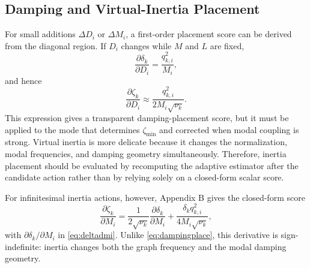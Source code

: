 \documentclass[journal]{IEEEtran}
\begin{document}
\subsection{Damping and Virtual-Inertia Placement}

For small additions $\Delta D_i$ or $\Delta M_i$, a first-order placement score can be derived from the diagonal region. If $D_i$ changes while $M$ and $L$ are fixed,
\begin{equation}
\frac{\partial \delta_k}{\partial D_i}=\frac{q_{k,i}^2}{M_i},
\end{equation}
and hence
\begin{equation}
\frac{\partial \zeta_k}{\partial D_i}\approx
\frac{q_{k,i}^2}{2M_i\sqrt{\nu_k}}.
\label{eq:dampingplace}
\end{equation}
This expression gives a transparent damping-placement score, but it must be applied to the mode that determines $\zeta_{\min}$ and corrected when modal coupling is strong. Virtual inertia is more delicate because it changes the normalization, modal frequencies, and damping geometry simultaneously. Therefore, inertia placement should be evaluated by recomputing the adaptive estimator after the candidate action rather than by relying solely on a closed-form scalar score.

For infinitesimal inertia actions, however, Appendix B gives the closed-form score
\begin{equation}
\frac{\partial\zeta_k}{\partial M_i}
=\frac{1}{2\sqrt{\nu_k}}\frac{\partial\delta_k}{\partial M_i}
+\frac{\delta_k q_{k,i}^2}{4M_i\sqrt{\nu_k}},
\label{eq:inertiascore}
\end{equation}
with $\partial\delta_k/\partial M_i$ in \eqref{eq:deltadmi}. Unlike \eqref{eq:dampingplace}, this derivative is sign-indefinite: inertia changes both the graph frequency and the modal damping geometry.
\end{document}
